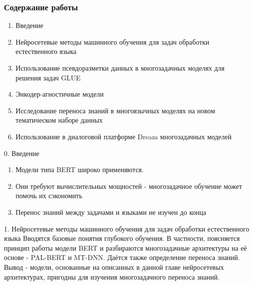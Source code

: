 \begin{frame}
\frametitle{Содержание работы}
\begin{enumerate}
    \item {Введение}
    \item {Нейросетевые методы машинного обучения для задач обработки естественного языка}
    \item {Использование псевдоразметки данных в многозадачных моделях для решения задач GLUE}
    \item {Энкодер-агностичные модели}
    \item {Исследование переноса знаний в многоязычных моделях на новом тематическом наборе данных}
    \item {Использование в диалоговой платформе {Dream} многозадачных моделей}
\end{enumerate}
\end{frame}

\begin{frame}{0. Введение}
\begin{enumerate}
\item Модели типа BERT широко применяются.
\item Они требуют вычислительных мощностей - многозадачное обучение может помочь их сэкономить
\item Перенос знаний между задачами и языками не изучен до конца
\end{enumerate}
\end{frame}

\begin{frame}{1. Нейросетевые методы машинного обучения  для задач обработки естественного языка}
Вводятся базовые понятия глубокого обучения. В частности, поясняется принцип работы модели BERT и разбираются многозадачные архитектуры на её основе - PAL-BERT и MT-DNN. Даётся также определение переноса знаний.
\newline
\newline
Вывод - модели, основанные на описанных в данной главе нейросетевых архитектурах, пригодны для изучения многозадачного переноса знаний.
\end{frame}

